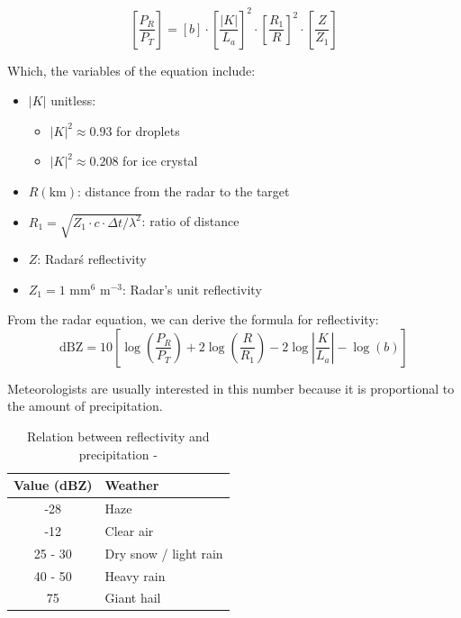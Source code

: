 \[
    \left[ \frac{P_R}{P_T} \right]=\left[ b \right]\cdot\left[ \frac{|K|}{L_a} \right]^2\cdot\left[ \frac{R_1}{R} \right]^2\cdot\left[ \frac{Z}{Z_1} \right]
\]
\vspace{0.5cm}

Which, the variables of the equation include:
\begin{itemize}
    \item $|K|$ unitless:
          \begin{itemize}
              \item $|K|^2 \approx 0.93$ for droplets
              \item $|K|^2 \approx 0.208$ for ice crystal
          \end{itemize}
    \item $R (\text{km})$: distance from the radar to the target
    \item $R_1 = \sqrt{Z_1 \cdot c \cdot \Delta t / \lambda^2}$: ratio of
    distance
    \item $Z$: Radar\'s reflectivity
    \item $Z_1 = 1 \text{ mm}^6 \text{ m}^{-3}$: Radar's unit reflectivity
\end{itemize}

From the radar equation, we can derive the formula for reflectivity:
\vspace{0.5cm}
\[
    \text{dBZ} = 10\left[ \log\left( \frac{P_R}{P_T} \right) + 2 \log\left( \frac{R}{R_1} \right) - 2\log\left| \frac{K}{L_a} \right| - \log\left( b \right) \right]
\]

Meteorologists are usually interested in this number because it is proportional
to the amount of precipitation.

\begin{table}[H]
    \centering
    \begin{tabular}{|c|l|}
        \hline
        Value (dBZ) & Weather               \\
        \hline
        -28         & Haze                  \\
        -12         & Clear air             \\
        25 - 30     & Dry snow / light rain \\
        40 - 50     & Heavy rain            \\
        75          & Giant hail            \\
        \hline
    \end{tabular}
    \vspace{1em}
    \caption{ Relation between reflectivity and precipitation -
    \citet{2022Weather}}
\end{table}

